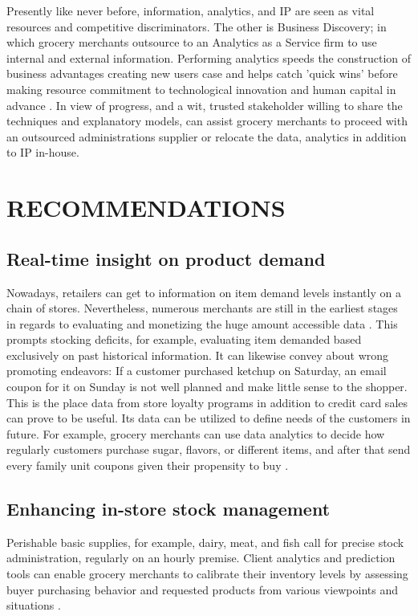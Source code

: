 \documentclass[sigconf]{acmart}
\begin{document}
Presently like never before, information, analytics, and IP are seen as vital resources and competitive discriminators. The other is Business Discovery; in which grocery merchants outsource to an Analytics as a Service firm to use internal and external information. Performing analytics speeds the construction of business advantages creating new users case and helps catch 'quick wins' before making resource commitment to technological innovation and human capital in advance \cite{13}. In view of progress, and a wit, trusted stakeholder willing to share the techniques and explanatory models, can assist grocery merchants to proceed with an outsourced administrations supplier or relocate the data, analytics in addition to IP in-house. 


\section{RECOMMENDATIONS}
\subsection{Real-time insight on product demand}

Nowadays, retailers can get to information on item demand levels instantly on a chain of stores. Nevertheless, numerous merchants are still in the earliest stages in regards to evaluating and monetizing the huge amount accessible data \cite{14}. This prompts stocking deficits, for example, evaluating item demanded based exclusively on past historical information. It can likewise convey about wrong promoting endeavors: If a customer purchased ketchup on Saturday, an email coupon for it on Sunday is not well planned and make little sense to the shopper.  \\

This is the place data from store loyalty programs in addition to credit card sales can prove to be useful. Its data can be utilized to define needs of the customers in future. For example, grocery merchants can use data analytics to decide how regularly customers purchase sugar, flavors, or different items, and after that send every family unit coupons given their propensity to buy \cite{12}.



\subsection{Enhancing in-store stock management }

Perishable basic supplies, for example, dairy, meat, and fish call for precise stock administration, regularly on an hourly premise. Client analytics and prediction tools can enable grocery merchants to calibrate their inventory levels by assessing buyer purchasing behavior and requested products from various viewpoints and situations \cite{12}. \\
\end{document}
